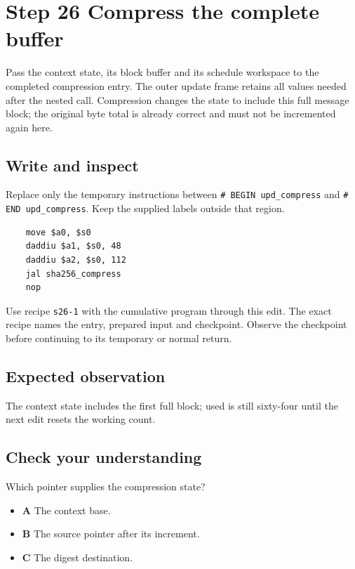 \section{Step 26 Compress the complete buffer}\label{sha-s26}

Pass the context state, its block buffer and its schedule workspace to the completed compression entry. The outer update frame retains all values needed after the nested call. Compression changes the state to include this full message block; the original byte total is already correct and must not be incremented again here.

\subsection{Write and inspect}
Replace only the temporary instructions between \texttt{\# BEGIN upd\_compress} and \texttt{\# END upd\_compress}. Keep the supplied labels outside that region.

\begin{verbatim}
    move $a0, $s0
    daddiu $a1, $s0, 48
    daddiu $a2, $s0, 112
    jal sha256_compress
    nop
\end{verbatim}

Use recipe \texttt{s26-1} with the cumulative program through this edit. The exact recipe names the entry, prepared input and checkpoint. Observe the checkpoint before continuing to its temporary or normal return.

\subsection{Expected observation}
The context state includes the first full block; used is still sixty-four until the next edit resets the working count.

\subsection{Check your understanding}
Which pointer supplies the compression state?

\begin{itemize}
\item \textbf{A} The context base.
\item \textbf{B} The source pointer after its increment.
\item \textbf{C} The digest destination.
\end{itemize}
